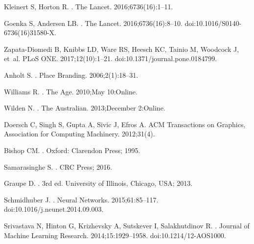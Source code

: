 \documentclass[10pt,letterpaper]{article}
\begin{document}
\begin{thebibliography}{}
Kleinert S, Horton R.
.
\newblock The Lancet. 2016;6736(16):1--11.

Goenka S, Andersen LB.
.
\newblock The Lancet. 2016;6736(16):8--10.
\newblock doi:{10.1016/S0140-6736(16)31580-X}.

Zapata-Diomedi B, Knibbs LD, Ware RS, Heesch KC, Tainio M, Woodcock J, et~al.
\newblock PLoS ONE. 2017;12(10):1--21.
\newblock doi:{10.1371/journal.pone.0184799}.

Anholt S.
.
\newblock Place Branding. 2006;2(1):18--31.

Williams R.
.
\newblock The Age. 2010;May 10:Online.

Wilden N.
.
\newblock The Australian. 2013;December 2:Online.

Doersch C, Singh S, Gupta A, Sivic J, Efros A.
\newblock ACM Transactions on Graphics, Association for Computing Machinery.
  2012;31(4).

Bishop CM.
.
\newblock Oxford: Clarendon Press; 1995.

Samarasinghe S.
.
\newblock CRC Press; 2016.

Graupe D.
.
\newblock 3rd ed. University of Illinois, Chicago, USA; 2013.

Schmidhuber J.
.
\newblock Neural Networks. 2015;61:85--117.
\newblock doi:{10.1016/j.neunet.2014.09.003}.

Srivastava N, Hinton G, Krizhevsky A, Sutskever I, Salakhutdinov R.
.
\newblock Journal of Machine Learning Research. 2014;15:1929--1958.
\newblock doi:{10.1214/12-AOS1000}.


\end{thebibliography}
\end{document}
